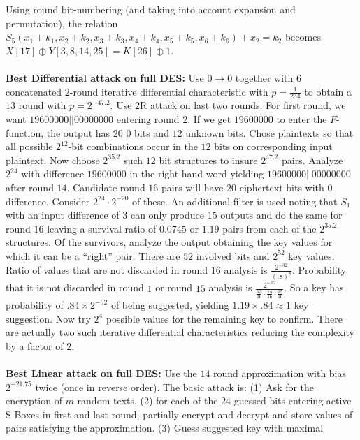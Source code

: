 Using round bit-numbering (and taking into account expansion and permutation),
the relation $S_5(x_1+k_1, x_2+k_2, x_3+k_3, x_4+k_4, x_5+k_5, x_6+k_6)+x_2= k_2$
becomes $X[17] \oplus Y[3,8,14,25]= K[26] \oplus 1$.
\\
\\
{\bf Best Differential attack on full DES: }
Use $0 \rightarrow 0$ together with $6$ concatenated $2$-round iterative differential 
characteristic with $p= {\frac 1 {234}}$ to obtain a $13$ round with $p= 2^{-47.2}$.
Use $2$R attack on last two rounds.  For first round, we want $19 60 00 00 || 00 00 00 00$
entering round $2$.  If we get $19 60 00 00$ to enter the $F$-function, the output
has $20$ $0$ bits and $12$ unknown bits. Chose plaintexts so that all possible
$2^{12}$-bit combinations occur in the $12$ bits on corresponding input plaintext.
Now choose $2^{35.2}$ such $12$ bit structures to insure $2^{47.2}$ pairs.  Analyze 
$2^{24}$ with difference $19 60 00 00$ in the right hand word yielding
$19 60 00 00 || 00 00 00 00$ after round $14$.  Candidate round $16$ pairs will have
$20$ ciphertext bits with $0$ difference.  Consider $2^{24} \cdot 2^{-20}$ of these.
An additional filter is used noting that $S_1$ with an input difference of $3$ can
only produce $15$ outputs and do the same for round $16$ leaving a survival ratio
of $0.0745$ or $1.19$ pairs from each of the $2^{35.2}$ structures.  Of the survivors,
analyze the output obtaining the key values for which it can be a ``right'' pair.
There are $52$ involved bits and $2^{52}$ key values.  Ratio of values that are not
discarded in round $16$ analysis is ${\frac {2^{-32}} {(.8)^8}}$.  
Probability that it
is not discarded in round $1$ or round $15$ analysis is ${\frac {2^{-12}} {
{\frac {13} {16}} \cdot
{\frac {14} {16}} \cdot
{\frac {15} {16}}}}$.  So a key has probability of $.84 \times 2^{-52}$ of being
suggested, yielding $1.19 \times .84 \approx 1$ key suggestion.  Now try
$2^4$ possible values for the remaining key to confirm.  There are actually two
such iterative differential characteristics reducing the complexity by a factor of
$2$.
\\
\\
{\bf Best Linear attack on full DES: }
Use the $14$ round approximation with bias $2^{-21.75}$ twice (once in reverse order).
The basic attack is:
(1) Ask for the encryption of $m$ random texts. (2) for each of the $24$ guessed bits
entering active S-Boxes in first and last round, partially encrypt and decrypt and
store values of pairs satisfying the approximation.  (3) Guess suggested key with maximal
